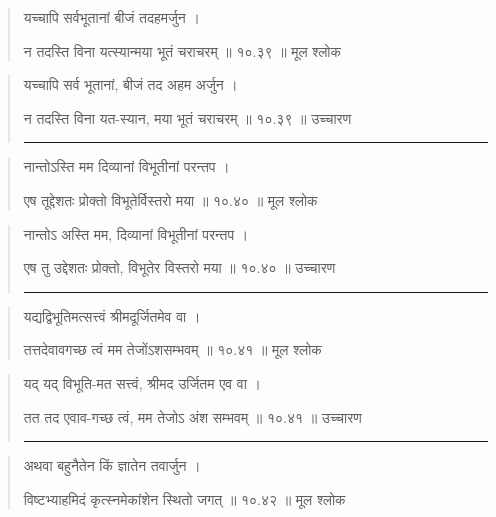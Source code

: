 \begin{quotation} 

यच्चापि सर्वभूतानां बीजं तदहमर्जुन  ।  

न तदस्ति विना यत्स्यान्मया भूतं चराचरम्‌  ॥ १०.३९ ॥  मूल श्लोक
\end{quotation}

\begin{quotation}

यच्चापि सर्व भूतानां, बीजं तद अहम अर्जुन  ।  

न तदस्ति विना यत-स्यान, मया भूतं चराचरम्‌  ॥ १०.३९ ॥  उच्चारण

\noindent\rule{16cm}{0.4pt} 
\end{quotation}


\begin{quotation} 
नान्तोऽस्ति मम दिव्यानां विभूतीनां परन्तप  ।  

एष तूद्देशतः प्रोक्तो विभूतेर्विस्तरो मया  ॥ १०.४० ॥  मूल श्लोक
\end{quotation}

\begin{quotation}

नान्तोऽ अस्ति मम, दिव्यानां विभूतीनां परन्तप  ।  

एष तु उद्देशतः प्रोक्तो, विभूतेर विस्तरो मया  ॥ १०.४० ॥  उच्चारण

\noindent\rule{16cm}{0.4pt} 
\end{quotation}


\begin{quotation} 

यद्यद्विभूतिमत्सत्त्वं श्रीमदूर्जितमेव वा  ।  

तत्तदेवावगच्छ त्वं मम तेजोंऽशसम्भवम्‌  ॥ १०.४१ ॥  मूल श्लोक
\end{quotation}

\begin{quotation}

यद् यद् विभूति-मत सत्त्वं, श्रीमद उर्जितम एव वा  ।  

तत तद एवाव-गच्छ त्वं, मम तेजोऽ अंश सम्भवम्‌  ॥ १०.४१ ॥  उच्चारण

\noindent\rule{16cm}{0.4pt} 
\end{quotation}


\begin{quotation} 

अथवा बहुनैतेन किं ज्ञातेन तवार्जुन  ।  

विष्टभ्याहमिदं कृत्स्नमेकांशेन स्थितो जगत्‌  ॥ १०.४२ ॥  मूल श्लोक
\end{quotation}

